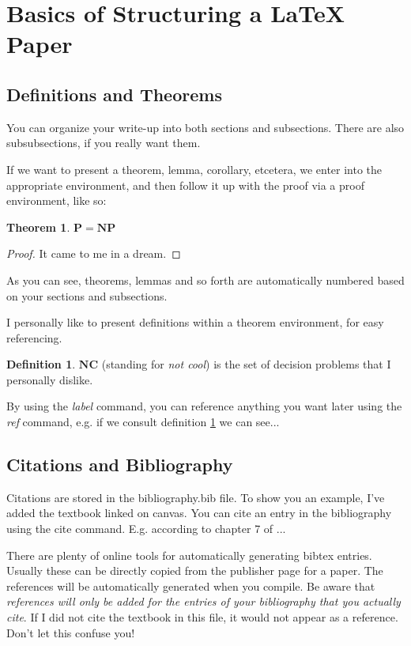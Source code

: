 \documentclass{article}
\theoremstyle{definition}
\newtheorem{definition}{Definition}[section]
\theoremstyle{plain}
\theoremstyle{plain}
\newtheorem{theorem}{Theorem}[section]
\begin{document}
\section{Basics of Structuring a LaTeX Paper}

\subsection{Definitions and Theorems}
You can organize your write-up into both sections and subsections. There are also subsubsections, if you really want them. 

If we want to present a theorem, lemma, corollary, etcetera, we enter into the appropriate environment, and then follow it up with the proof via a proof environment, like so:

\begin{theorem}
    $\mathbf{P} = \mathbf{NP}$
\end{theorem}

\begin{proof}
    It came to me in a dream.
\end{proof}

As you can see, theorems, lemmas and so forth are automatically numbered based on your sections and subsections. 

I personally like to present definitions within a theorem environment, for easy referencing.
\begin{definition}\label{NC}
    $\mathbf{NC}$ (standing for \emph{not cool}) is the set of decision problems that I personally dislike. 
\end{definition}

By using the \emph{label} command, you can reference anything you want later using the \emph{ref} command, e.g. if we consult definition \ref{NC} we can see...

\subsection{Citations and Bibliography}

Citations are stored in the bibliography.bib file. To show you an example, I've added the textbook linked on canvas. You can cite an entry in the bibliography using the cite command. E.g. according to chapter 7 of \cite{papadimitriouComputationalComplexity1994}...

There are plenty of online tools for automatically generating bibtex entries. Usually these can be directly copied from the publisher page for a paper. The references will be automatically generated when you compile. Be aware that \emph{references will only be added for the entries of your bibliography that you actually cite}. If I did not cite the textbook in this file, it would not appear as a reference. Don't let this confuse you!
\printbibliography
\end{document}
